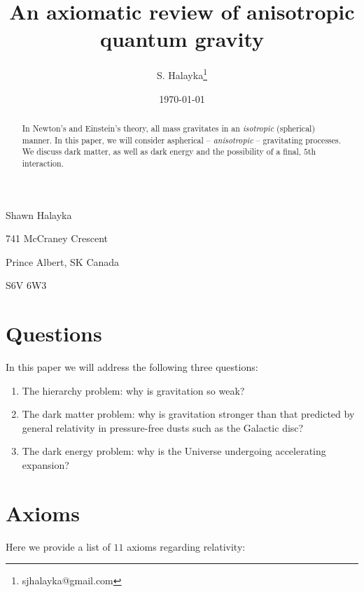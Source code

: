 \documentclass[12pt]{article}
\title{An axiomatic review of anisotropic quantum gravity}
\author{S. Halayka\footnote{sjhalayka@gmail.com}}
\date{\today\;\currenttime}
\begin{document}
 
\maketitle



Shawn Halayka

741 McCraney Crescent

Prince Albert, SK Canada

S6V 6W3



\begin{abstract}
In Newton's and Einstein's theory, all mass gravitates in an {\textit{isotropic}} (spherical) manner.
In this paper, we will consider aspherical -- {\textit{anisotropic}} -- gravitating processes.
We discuss dark matter, as well as dark energy and the possibility of a final, $5$th interaction.
\end{abstract}


\section{Questions}

In this paper we will address the following three questions:
\begin{enumerate}
\item The hierarchy problem: why is gravitation so weak?
\item The dark matter problem: why is gravitation stronger than that predicted by general relativity in pressure-free dusts such as the Galactic disc?
\item The dark energy problem: why is the Universe undergoing accelerating expansion?
\end{enumerate}






\section{Axioms}

Here we provide a list of $11$ axioms regarding relativity:
\end{document}
